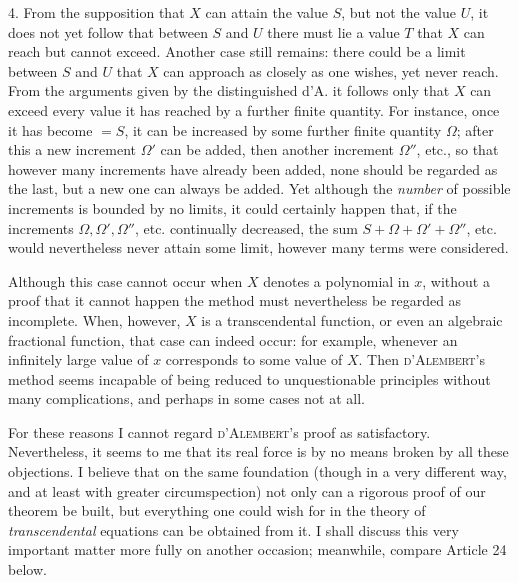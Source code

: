 4. From the supposition that $X$ can attain the value $S$, but not the value $U$, it does not yet follow that between $S$ and $U$ there must lie a value $T$ that $X$ can reach but cannot exceed. Another case still remains: there could be a limit between $S$ and $U$ that $X$ can approach as closely as one wishes, yet never reach. From the arguments given by the distinguished d'A. it follows only that $X$ can exceed every value it has reached by a further finite quantity. For instance, once it has become $=S$, it can be increased by some further finite quantity $\Omega$; after this a new increment $\Omega'$ can be added, then another increment $\Omega''$, etc., so that however many increments have already been added, none should be regarded as the last, but a new one can always be added. Yet although the \textit{number} of possible increments is bounded by no limits, it could certainly happen that, if the increments $\Omega,\Omega',\Omega''$, etc. continually decreased, the sum $S+\Omega+\Omega'+\Omega''$, etc. would nevertheless never attain some limit, however many terms were considered.

Although this case cannot occur when $X$ denotes a polynomial in $x$, without a proof that it cannot happen the method must nevertheless be regarded as incomplete. When, however, $X$ is a transcendental function, or even an algebraic fractional function, that case can indeed occur: for example, whenever an infinitely large value of $x$ corresponds to some value of $X$. Then \textsc{d'Alembert}'s method seems incapable of being reduced to unquestionable principles without many complications, and perhaps in some cases not at all.

For these reasons I cannot regard \textsc{d'Alembert}'s proof as satisfactory. Nevertheless, it seems to me that its real force is by no means broken by all these objections. I believe that on the same foundation (though in a very different way, and at least with greater circumspection) not only can a rigorous proof of our theorem be built, but everything one could wish for in the theory of \textit{transcendental} equations can be obtained from it. I shall discuss this very important matter more fully on another occasion; meanwhile, compare Article 24 below.
